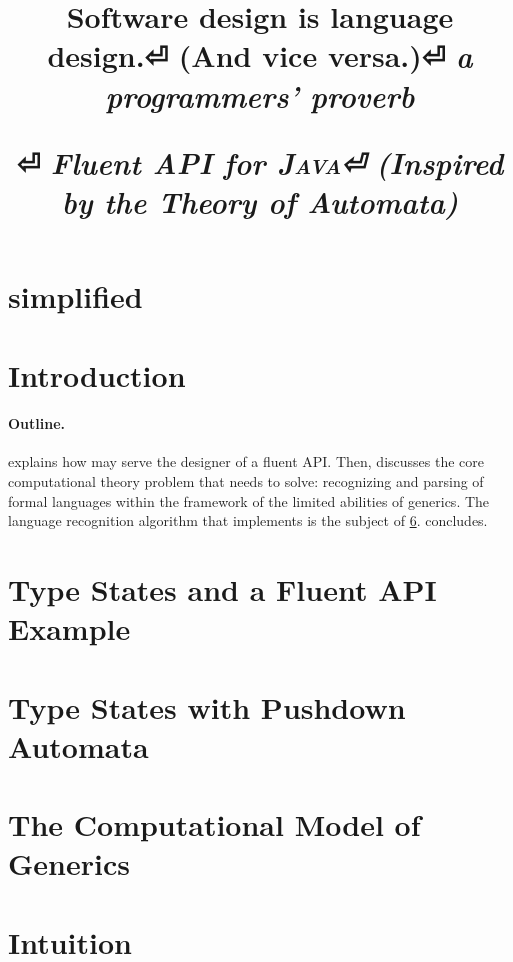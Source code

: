 \documentclass[nonatbib,preprint,numbers]{sigplanconf}
\title{%
\begin{flushright}
  \scriptsize\bfseries
  Software design is language design.⏎
    (And vice versa.)⏎
  \footnotesize\mdseries\itshape
   a programmers' proverb
\end{flushright}
  \Huge \Fajita⏎
  \huge \itshape \textbf Fluent \textbf API for \textsc{\textbf Java}⏎
  \LARGE (\textbf Inspired by the \textbf Theory of \textbf Automata)
}
\begin{document}
\section{simplified}


\maketitle

\begin{abstract}
  
\end{abstract}

\section{Introduction}


\paragraph{Outline.}

  explains how \Fajita may serve the designer of a fluent API\@.
Then,  discusses 
  the core computational theory problem that \Fajita
  needs to solve: recognizing and parsing of formal languages
  within the framework of the limited abilities of \Java
  generics.
The language recognition algorithm that \Fajita
  implements is the subject of \cref{section:intuition}.
 concludes.

\section{Type States and a Fluent API Example}
\label{section:example}


\section{Type States with Pushdown Automata}
\label{section:generalization}


\section{The Computational Model of \protect\Java Generics}
\label{section:background}


\section{Intuition}
\label{section:intuition}

\end{document}
